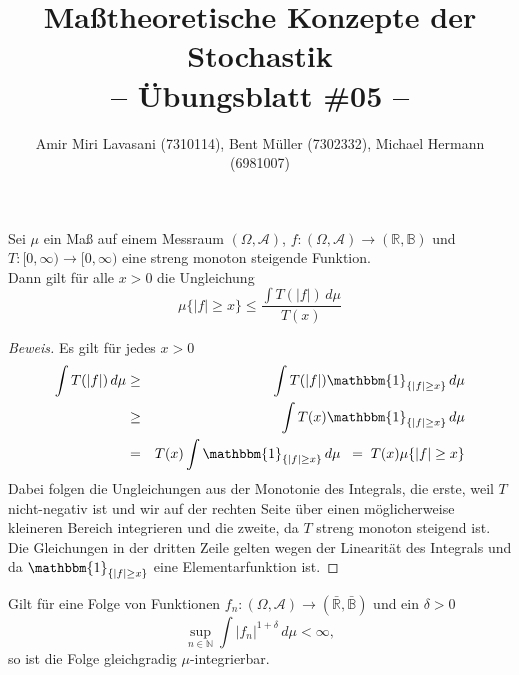 \documentclass[10pt]{article}
\newenvironment{Aufgabe}[2][Aufgabe]{\begin{trivlist}
\item[\hskip \labelsep {\bfseries #1}\hskip \labelsep {\bfseries #2.}]}{\end{trivlist}}
\begin{document}
 
\title{ \textbf{Maßtheoretische Konzepte der Stochastik \\ -- Übungsblatt \#05 --} }

\author{Amir Miri Lavasani (7310114), Bent Müller (7302332),
        Michael Hermann (6981007)}
\maketitle

\begin{Aufgabe}{1} %
Sei $\mu$ ein Maß auf einem Messraum $(\Omega, \mathcal{A})$, $f: (\Omega, \mathcal{A}) \rightarrow (\mathbb{R}, \mathbb{B})$ und  $T: [0, \infty) \rightarrow [0, \infty)$ eine streng monoton steigende Funktion. \\
Dann gilt für alle $x > 0$ die Ungleichung
$$
\mu\{|f| \geq x \} \leq \frac{\int T(|f|) \, d\mu}{T(x)}
$$
\end{Aufgabe}

\begin{proof}[Beweis]
Es gilt für jedes $x > 0$
\begin{eqnarray*}
\int T(|f|) \, d\mu &\geq& \int T(|f|) \mathbbm{1}_{\{|f| \geq x\}} \, d\mu \\
			 &\geq& \int T(x) \mathbbm{1}_{\{|f| \geq x\}} \, d\mu \\
			 &=& T(x)  \int \mathbbm{1}_{\{|f| \geq x\}} \, d\mu \;\; =  \; T(x) \mu\{|f| \geq x\}
\end{eqnarray*}
Dabei folgen die Ungleichungen aus der Monotonie des Integrals, die erste, weil $T$ nicht-negativ ist und wir auf der rechten Seite über einen möglicherweise kleineren Bereich integrieren und die zweite, da $T$ streng monoton steigend ist. Die Gleichungen in der dritten Zeile gelten wegen der Linearität des Integrals und da $\mathbbm{1}_{\{|f| \geq x\}}$ eine Elementarfunktion ist.
\end{proof}


\begin{Aufgabe}{2} %
Gilt für eine Folge von Funktionen $f_n:(\Omega, \mathcal{A}) \rightarrow (\bar{\mathbb{R}}, \bar{\mathbb{B}})$ und ein $\delta > 0$
$$
\sup_{n \in \mathbb{N}} \int |f_n|^{1+\delta} \, d\mu < \infty,
$$
so ist die Folge gleichgradig $\mu$-integrierbar.
\end{Aufgabe}
\end{document}
